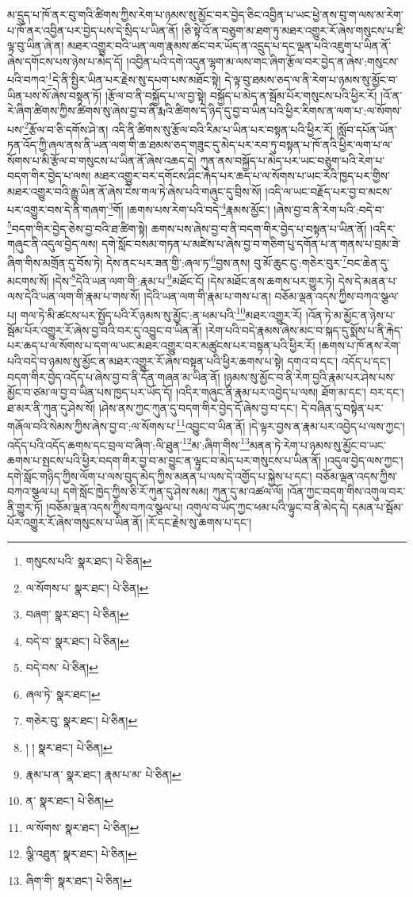 མ་དྲུད་པ་ཁོ་ནར་བུ་གའི་ཚིགས་ཀྱིས་རེག་པ་ཉམས་སུ་མྱོང་བར་བྱེད་ཅིང་འབྱིན་པ་ཡང་ཕྱེ་ནས་བུ་ག་ལས་མ་རེག་པ་ཁོ་ནར་འབྱིན་པར་བྱེད་པས་དེ་སྲིད་པ་ཡིན་ནོ། །ཅི་སྟེ་འོ་ན་བཅུག་མ་ཐག་ཏུ་མཐར་འགྱུར་རོ་ཞེས་གསུངས་པ་ཇི་ལྟ་བུ་ཡིན་ཞེ་ན། མཐར་འགྱུར་བའི་ཡན་ལག་རྣམས་ཚང་བར་ཡོད་ན་འདྲུད་པ་དང་ལྡན་པའི་འཇུག་པ་ཡིན་ནོ་ཞེས་དགོངས་པས་ཉེས་པ་མེད་དོ། །འབྱིན་པའི་དགེ་འདུན་ལྷག་མ་ལས་གང་ཞིག་རྩོལ་བར་བྱེད་ན་ཞེས་:གསུངས་པའི་བཀའ་\footnote{གསུངས་པའི་  སྣར་ཐང་།  པེ་ཅིན། }དེ་ནི་སྤྱིར་ཡིན་པར་རྗེས་སུ་དཔག་པས་མཐོང་སྟེ། དེ་ལྟ་བུ་ཐམས་ཅད་ལ་ནི་རེག་པ་ཉམས་སུ་མྱོང་བ་ཡིན་པས་སོ་ཞེས་བསྟན་ཏོ། །རྩོལ་བ་ནི་བསྐྱོད་པ་ལ་བྱ་སྟེ། བསྐྱོད་པ་མེད་ན་སྦོམ་པོར་གསུངས་པའི་ཕྱིར་རོ། །འོ་ན་རེ་ཞིག་ཚིགས་ཀྱིས་ཚིགས་སུ་ཞེས་བྱ་བ་ནི་རྨའི་ཚིགས་དེ་ཉིད་དུ་བྱ་བ་ཡིན་པའི་ཕྱིར་རིགས་ན་ལག་པ་:ལ་སོགས་པས་\footnote{ལ་སོགས་པ་  སྣར་ཐང་།  པེ་ཅིན། }རྩོལ་བ་ཅི་དགོས་ཤེ་ན། འདི་ནི་ཚིགས་སུ་རྩོལ་བའི་རིམ་པ་ཡིན་པར་བསྟན་པའི་ཕྱིར་རོ། །སློབ་དཔོན་ཡོན་ཏན་འོད་ཀྱི་ཞལ་ནས་ནི་ཡན་ལག་གི་ཆ་ཐམས་ཅད་གཟུང་དུ་མེད་པར་རབ་ཏུ་བསྟན་པ་ཁོ་ནའི་ཕྱིར་ལག་པ་ལ་སོགས་པ་མི་རྩོལ་བ་གསུངས་པ་ཡིན་ནོ་ཞེས་འཆད་དེ། ཀུན་ནས་བསྐྱོད་པ་མེད་པར་ཡང་བཅུག་པའི་རེག་པ་བདག་གིར་བྱེད་པ་ལས། མཐར་འགྱུར་བར་དགོངས་ཤིང་རྐེད་པར་ཆད་པ་ལ་སོགས་པ་ཡང་རོའི་ཁྱད་པར་གྱིས་མཐར་འགྱུར་བའི་རྒྱུ་ཡིན་ནོ་ཞེས་ངེས་གལ་ཏེ་ཞེས་པའི་གཞུང་དུ་བྲིས་སོ། །འདི་ལ་ཡང་བརྗོད་པར་བྱ་བ་མངས་པར་འགྱུར་བས་དེ་ནི་གཞག་\footnote{བཞག་  སྣར་ཐང་།  པེ་ཅིན། }གོ། །ཆགས་པས་རེག་པའི་བདེ་\footnote{བདེ་བ་  སྣར་ཐང་།  པེ་ཅིན། }རྣམས་མྱོང་། །ཞེས་བྱ་བ་ནི་རེག་པའི་:བདེ་བ་\footnote{བདེ་བས་  པེ་ཅིན། }བདག་གིར་བྱེད་ཅེས་བྱ་བའི་ཐ་ཚིག་སྟེ། ཆགས་པས་ཞེས་བྱ་བ་ནི་བདག་གིར་བྱེད་པ་བསྟན་པ་ཡིན་ནོ། །འདིར་གཞུང་ནི་འདུལ་བྱེད་ལས། དགེ་སློང་བསམ་གཏན་པ་མཛེས་པ་ཞེས་བྱ་བ་གཅིག་པུ་དགོན་པ་ན་གནས་པ་བྲམ་ཟེ་ཞིག་གིས་མགྲོན་དུ་བོས་ཏེ། དེས་ནང་པར་ཟན་གྱི་:ཞལ་ཏ་\footnote{ཞལ་ཏེ་  སྣར་ཐང་། }བྱས་ནས། བུ་མོ་ཆུང་ངུ་:གཅེར་བུར་\footnote{གཅེར་བུ་  སྣར་ཐང་།  པེ་ཅིན། }བང་ཆེན་དུ་མངགས་སོ། །དེས་\footnote{། །  སྣར་ཐང་།  པེ་ཅིན། }དེའི་ཡན་ལག་གི་:རྣམ་པ་\footnote{རྣམ་པ་ན་  སྣར་ཐང་། རྣམ་པ་མ་  པེ་ཅིན། }མཐོང་ངོ། །དེས་མཐོང་ནས་ཆགས་པར་གྱུར་ཏེ། དེས་དེ་མནན་པ་ལས་དེའི་ཡན་ལག་གི་རྣམ་པ་གས་སོ། །དེའི་ཡན་ལག་གི་རྣམ་པ་གས་པ་ན། བཅོམ་ལྡན་འདས་ཀྱིས་བཀའ་སྩལ་པ། གལ་ཏེ་མི་ཚངས་པར་སྤྱོད་པའི་རོ་ཉམས་སུ་མྱོང་:ན་ཕམ་པའི་\footnote{ན་  སྣར་ཐང་།  པེ་ཅིན། }མཐར་འགྱུར་རོ། །འོན་ཏེ་མ་མྱོང་ན་ཉེས་པ་སྦོམ་པོར་འགྱུར་རོ་ཞེས་བྱ་བའི་བར་དུ་འབྱུང་བ་ཡིན་ནོ། །རེག་པའི་བདེ་རྣམས་ཞེས་མང་བ་སྐད་དུ་སྨོས་པ་ནི་རྐེད་པར་ཆད་པ་ལ་སོགས་པ་དག་ལ་ཡང་མཐར་འགྱུར་བར་མཚུངས་པར་བསྟན་པའི་ཕྱིར་རོ། །ཆགས་པ་ཁོ་ནས་རེག་པའི་བདེ་བ་ཉམས་སུ་མྱོང་ན་མཐར་འགྱུར་རོ་ཞེས་བསྟན་པའི་ཕྱིར་ཆགས་པ་སྟེ། དགའ་བ་དང་། འདོད་པ་དང་། བདག་གིར་བྱེད་འདོད་པ་ཞེས་བྱ་བ་ནི་དོན་གཞན་མ་ཡིན་ནོ། །ཉམས་སུ་མྱོང་བ་ནི་རེག་བྱའི་རྣམ་པར་ཤེས་པས་མྱོང་བ་ཙམ་ལ་བྱ་བ་ཡིན་པས་ཁྱད་པར་ཡོད་དོ། །འདིར་གཞུང་ནི་རྣམ་པར་འབྱེད་པ་ལས། ཐོག་མ་དང་། བར་དང་། ཐ་མར་ནི་ཀུན་དུ་ཤེས་སོ། །ཤེས་ནས་ཀྱང་ཀུན་དུ་བདག་གིར་བྱེད་དོ་ཞེས་བྱ་བ་དང་། དེ་བཞིན་དུ་བསྟེན་པར་གཞོལ་བའི་སེམས་ཀྱིས་ཞེས་བྱ་བ་:ལ་སོགས་པ་\footnote{ལ་སོགས་  སྣར་ཐང་།  པེ་ཅིན། }འབྱུང་བ་ཡིན་ནོ། །དེ་ལྟར་བྱས་ན་རྣམ་པར་འབྱེད་པ་ལས་ཀྱང་། འདོད་པའི་འདོད་ཆགས་དང་བྲལ་བ་ཞིག་:ལི་ཐུན་\footnote{ལྕི་འཐུན་  སྣར་ཐང་།  པེ་ཅིན། }མ་:ཞིག་གིས་\footnote{ཞིག་གི་  སྣར་ཐང་།  པེ་ཅིན། }མནན་ཏེ་རེག་པ་ཉམས་སུ་མྱོང་བ་ཡང་ཆགས་པ་སྤངས་པའི་ཕྱིར་བདག་གིར་བྱ་བ་མ་བྱུང་ན་ལྟུང་བ་མེད་པར་གསུངས་པ་ཡིན་ནོ། །འདུལ་བྱེད་ལས་ཀྱང་། དགེ་སློང་གཉིད་ཀྱིས་ལོག་པ་ལས་བུད་མེད་ཀྱིས་མནན་པ་ལས་དེ་འགྱོད་པ་སྐྱེས་པ་དང་། བཅོམ་ལྡན་འདས་ཀྱིས་བཀའ་སྩལ་པ། དགེ་སློང་ཁྱེད་ཀྱིས་ཅི་རོ་ཀུན་དུ་ཤེས་སམ། ཀུན་དུ་མ་འཚལ་ལོ། །འོན་ཀྱང་བདག་གིས་འགུལ་བར་ནི་གྱུར་ཏོ། །བཅོམ་ལྡན་འདས་ཀྱིས་བཀའ་སྩལ་པ། འགུལ་བ་ཡོད་ཀྱང་ཕམ་པའི་ལྟུང་བ་ནི་མེད་དེ། དམན་པ་སྦོམ་པོར་འགྱུར་རོ་ཞེས་གསུངས་པ་ཡིན་ནོ། །རོ་དང་རྗེས་སུ་ཆགས་པ་དང་། 